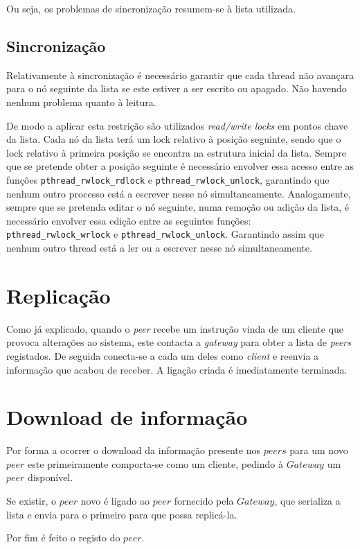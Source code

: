 \documentclass[a4paper, 12pt]{article}
\newcommand{\gateway}{\textit{gateway}\xspace}
\newcommand{\peer}{\textit{peer}\xspace}
\newcommand{\cliente}{\textit{client}\xspace}
\newcommand{\peers}{\textit{peers}\xspace}
\begin{document}
Ou seja, os problemas de sincronização resumem-se à lista utilizada.

\subsection{Sincronização}

Relativamente à sincronização é necessário garantir que cada thread não avançara para o nó seguinte da lista se este estiver a ser escrito ou apagado. Não havendo nenhum problema quanto à leitura.

De modo a aplicar esta restrição são utilizados \textit{read/write locks} em pontos chave da lista. Cada nó da lista terá um lock relativo à posição seguinte, sendo que o lock relativo à primeira posição se encontra na estrutura inicial da lista. Sempre que se pretende obter a posição seguinte é necessário envolver essa acesso entre as funções \texttt{pthread_rwlock_rdlock} e \texttt{pthread_rwlock_unlock}, garantindo que nenhum outro processo está a escrever nesse nó simultaneamente. Analogamente, sempre que se pretenda editar o nó seguinte, numa remoção ou adição da lista, é necessário envolver essa edição entre as seguintes funções: \texttt{pthread_rwlock_wrlock} e \texttt{pthread_rwlock_unlock}. Garantindo assim que nenhum outro thread está a ler ou a escrever nesse nó simultaneamente.

\section{Replicação}

Como já explicado, quando o \peer recebe um instrução vinda de um cliente que provoca alterações ao sistema, este contacta a \gateway para obter a lista de \peers registados. De seguida conecta-se a cada um deles como \cliente e reenvia a informação que acabou de receber. A ligação criada é imediatamente terminada.


\section{Download de informação}
\par Por forma a ocorrer o download da informação presente nos $peers$ para um novo $peer$ este primeiramente comporta-se como um cliente, pedindo à $Gateway$ um $peer$ disponível.
\par Se existir, o $peer$ novo é ligado ao $peer$ fornecido pela $Gateway$, que serializa a lista e envia para o primeiro para que possa replicá-la.
\par Por fim é feito o registo do $peer$.
\end{document}
